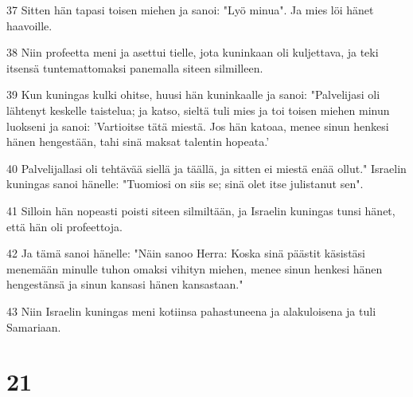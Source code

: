 \par 37 Sitten hän tapasi toisen miehen ja sanoi: "Lyö minua". Ja mies löi hänet haavoille.
\par 38 Niin profeetta meni ja asettui tielle, jota kuninkaan oli kuljettava, ja teki itsensä tuntemattomaksi panemalla siteen silmilleen.
\par 39 Kun kuningas kulki ohitse, huusi hän kuninkaalle ja sanoi: "Palvelijasi oli lähtenyt keskelle taistelua; ja katso, sieltä tuli mies ja toi toisen miehen minun luokseni ja sanoi: 'Vartioitse tätä miestä. Jos hän katoaa, menee sinun henkesi hänen hengestään, tahi sinä maksat talentin hopeata.'
\par 40 Palvelijallasi oli tehtävää siellä ja täällä, ja sitten ei miestä enää ollut." Israelin kuningas sanoi hänelle: "Tuomiosi on siis se; sinä olet itse julistanut sen".
\par 41 Silloin hän nopeasti poisti siteen silmiltään, ja Israelin kuningas tunsi hänet, että hän oli profeettoja.
\par 42 Ja tämä sanoi hänelle: "Näin sanoo Herra: Koska sinä päästit käsistäsi menemään minulle tuhon omaksi vihityn miehen, menee sinun henkesi hänen hengestänsä ja sinun kansasi hänen kansastaan."
\par 43 Niin Israelin kuningas meni kotiinsa pahastuneena ja alakuloisena ja tuli Samariaan.

\chapter{21}

